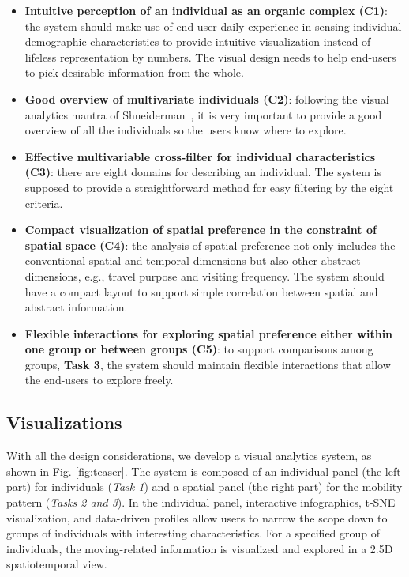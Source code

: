 \documentclass{ieeeaccess}
\begin{document}
\begin{itemize}
\item \textbf{Intuitive perception of an individual as an organic complex (C1)}: the system should make use of end-user daily experience in sensing individual demographic characteristics to provide intuitive visualization instead of lifeless representation by numbers. The visual design needs to help end-users to pick desirable information from the whole.
\item \textbf{Good overview of multivariate individuals (C2)}: following the visual analytics mantra of Shneiderman~\cite{RN459}, it is very important to provide a good overview of all the individuals so the users know where to explore.
\item \textbf{Effective multivariable cross-filter for individual characteristics (C3)}: there are eight domains for describing an individual. The system is supposed to provide a straightforward method for easy filtering by the eight criteria.
\item \textbf{Compact visualization of spatial preference in the constraint of spatial space (C4)}: the analysis of spatial preference not only includes the conventional spatial and temporal dimensions but also other abstract dimensions, e.g., travel purpose and visiting frequency. The system should have a compact layout to support simple correlation between spatial and abstract information.
\item \textbf{Flexible interactions for exploring spatial preference either within one group or between groups (C5)}: to support comparisons among groups, \textbf{Task 3}, the system should maintain flexible interactions that allow the end-users to explore freely.
\end{itemize}


\subsection{Visualizations}
\label{subsec:vis}

With all the design considerations, we develop a visual analytics system, as shown in Fig. \ref{fig:teaser}. The system is composed of an individual panel (the left part) for individuals (\textit{Task 1}) and a spatial panel (the right part) for the mobility pattern (\textit{Tasks 2 and 3}). In the individual panel, interactive infographics, t-SNE visualization, and data-driven profiles allow users to narrow the scope down to groups of individuals with interesting characteristics. For a specified group of individuals, the moving-related information is visualized and explored in a 2.5D spatiotemporal view.
\end{document}

